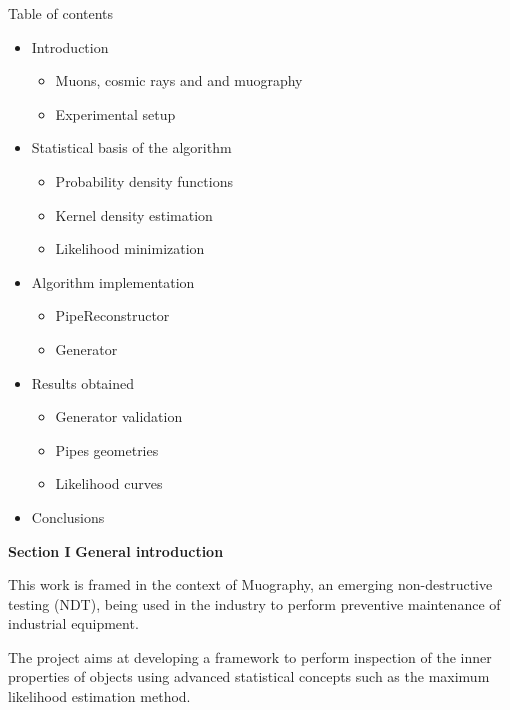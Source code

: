 \documentclass[handout,8 pt]{beamer}
\begin{document}
\begin{frame}{Table of contents}

	\begin{itemize}
		\item Introduction
		\begin{itemize}
			\item Muons, cosmic rays and and muography
			\item Experimental setup
		\end{itemize} \vfill
		\item Statistical basis of the algorithm
		\begin{itemize}
			\item Probability density functions
			\item Kernel density estimation
			\item Likelihood minimization
		\end{itemize} \vfill
		\item Algorithm implementation
		\begin{itemize}
			\item PipeReconstructor
			\item Generator
		\end{itemize} \vfill
		\item Results obtained
		\begin{itemize}
			\item Generator validation
			\item Pipes geometries
			\item Likelihood curves
		\end{itemize} \vfill
		\item Conclusions \vfill
	\end{itemize}

\end{frame}






\begin{frame}{}
	\centering
	\huge{\textbf{\color{mycolor} Section I}} \newline
	\LARGE{\textbf{\color{mycolor} General introduction \color{black}}} \vfill
	
	\LARGE{\textbf{\color{black} \color{black}}}\newline \vspace{10pt} \Large{This work is framed in the context of Muography, an emerging non-destructive testing (NDT), being used in the industry to perform preventive maintenance of industrial equipment. \\ \vspace{10pt}

The project aims at developing a framework to perform inspection of the inner properties of objects using advanced statistical concepts such as the maximum likelihood estimation method.} \vfill
\end{frame}
\end{document}
